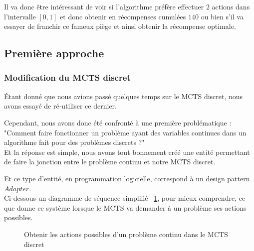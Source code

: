\documentclass[pdftex,french, english]{article}	%
\begin{document}
	Il va donc être intéressant de voir si l'algorithme préfère effectuer $2$ actions dans l'intervalle $[0,1]$ et donc obtenir en récompenses cumulées
	$140$ ou bien s'il va essayer de franchir ce fameux piège et ainsi obtenir la récompense optimale.

	\subsection{Première approche}
		\subsubsection{Modification du MCTS discret}

		Étant donné que nous avions passé quelques temps sur le MCTS discret, nous avons essayé de ré-utiliser ce dernier.

		Cependant, nous avons donc été confronté à une première problématique : "Comment faire fonctionner un problème ayant des variables continues dans un algorithme fait pour des problèmes discrets ?" \\

		Et la réponse est simple, nous avons tout bonnement créé une entité permettant de faire la jonction entre le problème continu et notre MCTS discret. 

		Et ce type d'entité, en programmation logicielle, correspond à un design pattern $Adapter$.\\

		Ci-dessous un diagramme de séquence simplifié ~\ref{fig:actionsPossibles}, pour mieux comprendre, ce que donne ce système lorsque le MCTS va demander à un problème ses actions possibles.
		\begin{figure}[H]
			\centering
			\caption{Obtenir les actions possibles d'un problème continu dans le MCTS discret} \label{fig:actionsPossibles}
		\end{figure}
\end{document}
